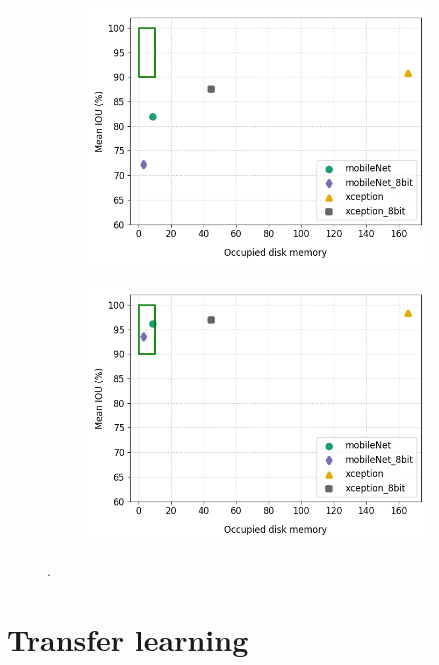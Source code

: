 \begin{figure}
\begin{subfigure}{.5\textwidth}
		\end{subfigure}
		\begin{subfigure}{.5\textwidth}
			\centering
			\includegraphics[width=1\linewidth]{images/q_mem_v_shape}
		\end{subfigure}
		\begin{subfigure}{.5\textwidth}
			\centering
			\includegraphics[width=1\linewidth]{images/q_mem_v_bin}
		\end{subfigure}
		\caption{.}
		\label{Fig:quant}
	\end{figure}

\section{Transfer learning}

